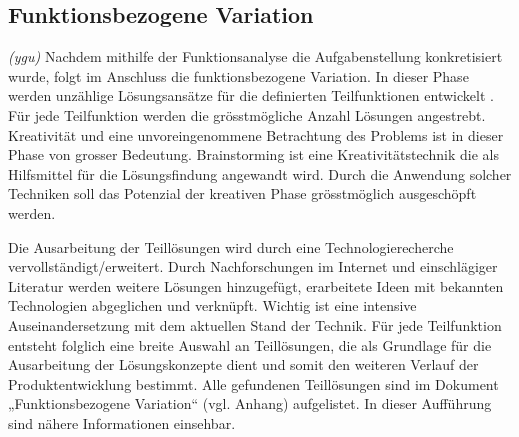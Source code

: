 \subsection{Funktionsbezogene Variation}
\label{funktionsbez_var}
\textit{(ygu)} Nachdem mithilfe der Funktionsanalyse die Aufgabenstellung konkretisiert wurde, folgt im Anschluss die funktionsbezogene Variation. In dieser Phase werden unzählige Lösungsansätze für die definierten Teilfunktionen entwickelt \cite{pahl}. Für jede Teilfunktion werden die grösstmögliche Anzahl Lösungen angestrebt.
\newline
Kreativität und eine unvoreingenommene Betrachtung des Problems ist in dieser Phase von grosser Bedeutung. Brainstorming ist eine Kreativitätstechnik die als Hilfsmittel für die Lösungsfindung angewandt wird. Durch die Anwendung solcher Techniken soll das Potenzial der kreativen Phase grösstmöglich ausgeschöpft werden.
\newline

Die Ausarbeitung der Teillösungen wird durch eine Technologierecherche vervollständigt/erweitert. Durch Nachforschungen im Internet und einschlägiger Literatur werden weitere Lösungen hinzugefügt, erarbeitete Ideen mit bekannten Technologien abgeglichen und verknüpft. Wichtig ist eine intensive Auseinandersetzung mit dem aktuellen Stand der Technik.
\newline
Für jede Teilfunktion entsteht folglich eine breite Auswahl an Teillösungen, die als Grundlage für die Ausarbeitung der Lösungskonzepte dient und somit den weiteren Verlauf der Produktentwicklung bestimmt. Alle gefundenen Teillösungen sind im Dokument „Funktionsbezogene Variation“ (vgl. Anhang) aufgelistet. In dieser Aufführung sind nähere Informationen einsehbar.